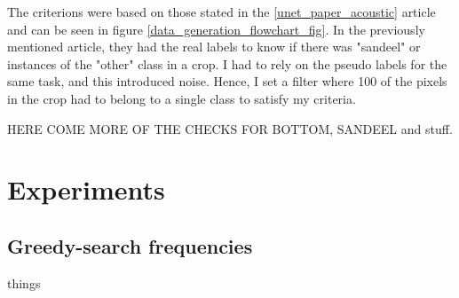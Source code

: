         The criterions were based on those stated in the \ref{unet_paper_acoustic} article and can be seen in figure \ref{data_generation_flowchart_fig}. In the previously mentioned article, they had the real labels to know if there was "sandeel" or instances of the "other" class in a crop. I had to rely on the pseudo labels for the same task, and this introduced noise. Hence, I set a filter where 100 of the pixels in the crop had to belong to a single class to satisfy my criteria. 
        
        
        
        
        
        HERE COME MORE OF THE CHECKS FOR BOTTOM, SANDEEL and stuff.
        


\section{Experiments}
    \subsection{Greedy-search frequencies}
        things
    